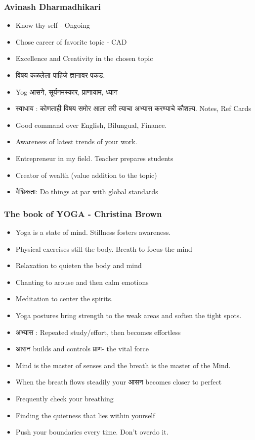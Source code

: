 \begin{frame}[fragile]\frametitle{Avinash Dharmadhikari}

	\begin{itemize}
	\item Know thy-self - Ongoing
	\item Chose career of favorite topic - CAD
	\item Excellence and Creativity in the chosen topic
	\item \textmarathi{विषय कळलेला पाहिजे ज्ञानावर पकड}. 
	\item Yog \textmarathi{आसने, सूर्यनमस्कार, प्राणायाम, ध्यान}
	\item \textmarathi{स्वाधाय : कोणताही विषय समोर आला तरी त्याचा अभ्यास करण्याचे कौशल्य}. Notes, Ref Cards
	\item Good command over English, Bilungual, Finance.
	\item Awareness of latest trends of your work.
	\item Entrepreneur in my field.  Teacher prepares students
	\item Creator of wealth (value addition to the topic)  
	\item \textmarathi{वैश्विकता}: Do things at par with global standards
	\end{itemize}

\end{frame}


\begin{frame}[fragile]\frametitle{The book of YOGA - Christina Brown}

	\begin{itemize}
	\item Yoga is a state of mind. Stillness fosters awareness.
	\item Physical exercises still the body. Breath to focus the mind
	\item Relaxation to quieten the body and mind
	\item Chanting to arouse and then calm emotions
	\item Meditation to center the spirits.
	\item Yoga postures bring strength to the weak areas and soften the tight spots.
	\item \textmarathi{अभ्यास }: Repeated study/effort, then becomes effortless
	\item  \textmarathi{आसन} builds and controls \textmarathi{प्राण}- the vital force
	\item Mind is the master of senses and the breath is the master of the Mind.
	\item When the breath flows steadily your \textmarathi{आसन }becomes closer to perfect
	\item Frequently check your breathing
	\item Finding the quietness that lies within yourself
	\item Push your boundaries every time. Don't overdo it.
	\end{itemize}

\end{frame}


